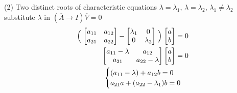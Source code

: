 \documentclass[10pt, letterpaper]{article}
\begin{document}
(2) Two distinct roots of characteristic equations $\lambda=\lambda_1$, $\lambda=\lambda_2$, $\lambda_1 \neq \lambda_2$ substitute $\lambda$ in $(\overline{A} \rightarrow I)\overline{V}=0$
\begin{align*}
\Bigm( \begin{bmatrix}
	a_{11} & a_{12}\\
	a_{21} & a_{22}
\end{bmatrix} - \begin{bmatrix}
	\lambda_1 & 0\\
	0 & \lambda_2
\end{bmatrix} \Bigm) \begin{bmatrix}
	a\\
	b
\end{bmatrix} = 0\\
\begin{bmatrix}
	a_{11}-\lambda & a_{12}\\
	a_{21} & a_{22}-\lambda
\end{bmatrix} \begin{bmatrix}
	a\\
	b
\end{bmatrix} = 0\\
\begin{cases}
	(a_{11}-\lambda)+a_{12}b=0\\
	a_{21}a+(a_{22}-\lambda_1)b=0
\end{cases}
\end{align*}
\end{document}
